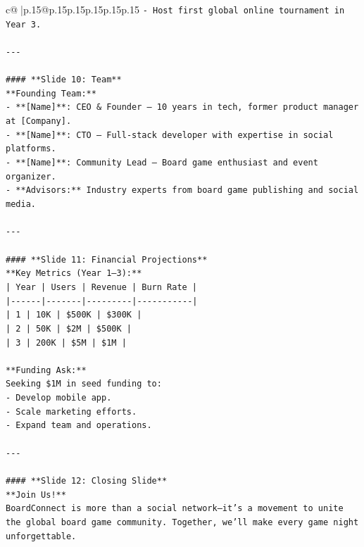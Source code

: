 \documentclass{article}
\begin{document}
{\begin{supertabular}{c@{$\;$}|p{.15\linewidth}@{}p{.15\linewidth}p{.15\linewidth}p{.15\linewidth}p{.15\linewidth}p{.15\linewidth}}
{{{\texttt{{-} Host first global online tournament in Year 3.  } \\
\\ 
\texttt{{-}{-}{-}} \\
\\ 
\texttt{\#\#\#\# **Slide 10: Team**} \\
\texttt{**Founding Team:**  } \\
\texttt{{-} **{[}Name{]}**: CEO \& Founder – 10 years in tech, former product manager at {[}Company{]}.  } \\
\texttt{{-} **{[}Name{]}**: CTO – Full{-}stack developer with expertise in social platforms.  } \\
\texttt{{-} **{[}Name{]}**: Community Lead – Board game enthusiast and event organizer.  } \\
\texttt{{-} **Advisors:** Industry experts from board game publishing and social media.  } \\
\\ 
\texttt{{-}{-}{-}} \\
\\ 
\texttt{\#\#\#\# **Slide 11: Financial Projections**} \\
\texttt{**Key Metrics (Year 1–3):**  } \\
\texttt{| Year | Users | Revenue | Burn Rate |  } \\
\texttt{|{-}{-}{-}{-}{-}{-}|{-}{-}{-}{-}{-}{-}{-}|{-}{-}{-}{-}{-}{-}{-}{-}{-}|{-}{-}{-}{-}{-}{-}{-}{-}{-}{-}{-}|  } \\
\texttt{| 1    | 10K   | \$500K   | \$300K     |  } \\
\texttt{| 2    | 50K   | \$2M     | \$500K     |  } \\
\texttt{| 3    | 200K  | \$5M     | \$1M       |  } \\
\\ 
\texttt{**Funding Ask:**  } \\
\texttt{Seeking \$1M in seed funding to:  } \\
\texttt{{-} Develop mobile app.  } \\
\texttt{{-} Scale marketing efforts.  } \\
\texttt{{-} Expand team and operations.  } \\
\\ 
\texttt{{-}{-}{-}} \\
\\ 
\texttt{\#\#\#\# **Slide 12: Closing Slide**} \\
\texttt{**Join Us!**  } \\
\texttt{BoardConnect is more than a social network—it’s a movement to unite the global board game community. Together, we’ll make every game night unforgettable.  } \\
}}}
\end{supertabular}}
\end{document}
